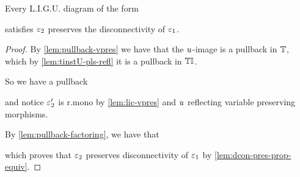 \begin{lemma}\label{lem:ligu-dcon}
    Every L.I.G.U. diagram of the form 
    satisfies $\varepsilon_2$ preserves the disconnectivity of $\varepsilon_1$.
\end{lemma}
\begin{proof}
    By \cref{lem:pullback-vpres} we have that the $\mathit{u}$-image is a pullback in $\mathbb{T}$,
    which by \cref{lem:tinstU-pls-refl} it is a pullback in ${\mathbb{T}\mathbb{I}}$.

    So we have a pullback
    \begin{center}
    \end{center}
    and notice $\varepsilon_2'$ is r.mono by \cref{lem:lic-vpres} and $\mathit{u}$ reflecting variable preserving morphisms. 
    
    By \cref{lem:pullback-factoring}, we have that 
    \begin{center}
    \end{center}
    which proves that $\varepsilon_2$ preserves disconnectivity of $\varepsilon_1$ by \cref{lem:dcon-pres-prop-equiv}. 
\end{proof}

